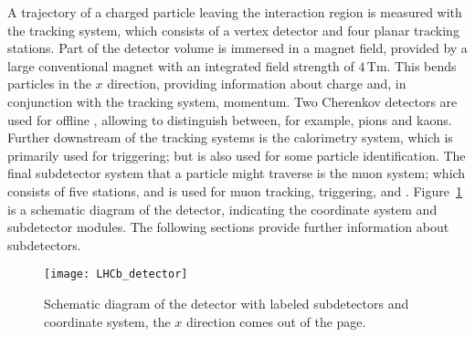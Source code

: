 



A trajectory of a charged particle leaving the interaction region is measured with the tracking
system, which
consists of a vertex detector and four planar tracking stations.
Part of the detector volume is immersed in a magnet field, provided by a large conventional magnet
with an integrated field strength of $4\,\mathrm{Tm}$.
This bends particles in the $x$ direction, providing information about charge and, in conjunction
with the tracking system, momentum.
Two Cherenkov detectors are used for offline \pid, allowing \lhcb to distinguish
between, for example, pions and kaons.
Further downstream of the tracking systems is the calorimetry system, which is primarily used for
triggering; but is also used for some particle identification.
The final subdetector system that a particle might traverse is the muon system; which
consists of five stations, and is used for muon tracking, triggering, and \pid.
Figure~\ref{fig:lhcb:lhcb} is a schematic diagram of the \lhcb detector, indicating the coordinate
system and subdetector modules.
The following sections provide further information about \lhcb subdetectors.


\begin{figure}
  \begin{center}
    \texttt{[image: LHCb\_detector]}
  \end{center}
  \caption[Diagram of the LHCb detector]
  {
    Schematic diagram of the \lhcb detector with labeled subdetectors and coordinate system, the
    $x$ direction comes out of the page.
  }
  \label{fig:lhcb:lhcb}
\end{figure}


